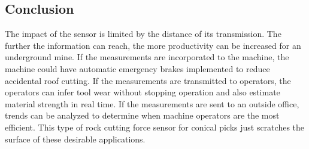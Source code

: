 \subsection{Conclusion}

The impact of the sensor is limited by the distance of its transmission. 
The further the information can reach, the more productivity can be increased for an underground mine.
If the measurements are incorporated to the machine, the machine could have automatic emergency brakes 
implemented to reduce accidental roof cutting. If the measurements are transmitted to operators, the operators
can infer tool wear without stopping operation and also estimate material strength in real time.
If the measurements are sent to an outside office, trends can be analyzed to determine when machine operators
are the most efficient. This type of rock cutting force sensor for conical picks just scratches the surface of these desirable applications.


